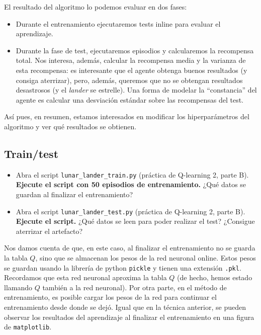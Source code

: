 \documentclass{article}
\begin{document}
El resultado del algoritmo lo podemos evaluar en dos fases:
\begin{itemize}
    \item Durante el entrenamiento ejecutaremos tests inline para evaluar el aprendizaje. 
    \item Durante la fase de test, ejecutaremos episodios y calcularemos la recompensa total. Nos interesa, además, calcular la recompensa media y la varianza de esta recompensa: es interesante que el agente obtenga buenos resultados (y consiga aterrizar), pero, además, queremos que no se obtengan resultados desastrosos (y el \textit{lander} se estrelle). Una forma de modelar la ``constancia'' del agente es calcular una desviación estándar sobre las recompensas del test.
\end{itemize}

Así pues, en resumen, estamos interesados en modificar los hiperparámetros del algoritmo y ver qué resultados se obtienen.

\subsection{Train/test}


\begin{exercise}
\begin{itemize}
\item Abra el script \texttt{lunar\_lander\_train.py} (práctica de Q-learning 2, parte B). \textbf{Ejecute el script con 50 episodios de entrenamiento.} ¿Qué datos se guardan al finalizar el entrenamiento?
\item Abra el script \texttt{lunar\_lander\_test.py} (práctica de Q-learning 2, parte B). \textbf{Ejecute el script.} ¿Qué datos se leen para poder realizar el test? ¿Consigue aterrizar el artefacto?
\end{itemize}
\end{exercise}

Nos damos cuenta de que, en este caso, al finalizar el entrenamiento no se guarda la tabla $Q$, sino que se almacenan los pesos de la red neuronal online. Estos pesos se guardan usando la librería de python \texttt{pickle} y tienen una extensión \texttt{.pkl}. Recordamos que esta red neuronal aproxima la tabla $Q$ (de hecho, hemos estado llamando $Q$ también a la red neuronal). Por otra parte, en el método de entrenamiento, es posible cargar los pesos de la red para continuar el entrenamiento desde donde se dejó. Igual que en la técnica anterior, se pueden observar los resultados del aprendizaje al finalizar el entrenamiento en una figura de \texttt{matplotlib}.
\end{document}
